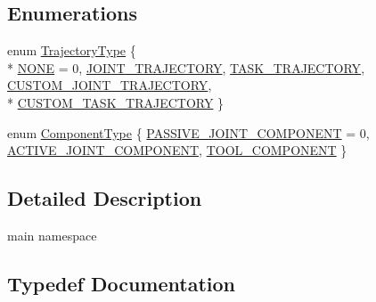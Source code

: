\subsection*{Enumerations}
\begin{DoxyCompactItemize}
\item 
enum \hyperlink{namespacerobotis__manipulator_a008c110bef924df2737c5583000a9293}{Trajectory\+Type} \{ \\*
\hyperlink{namespacerobotis__manipulator_a008c110bef924df2737c5583000a9293abe18ccc5ef07711d5fec3eed3304d2fe}{N\+O\+NE} = 0, 
\hyperlink{namespacerobotis__manipulator_a008c110bef924df2737c5583000a9293a093d62b8684b778b26a1dc4a56239f3a}{J\+O\+I\+N\+T\+\_\+\+T\+R\+A\+J\+E\+C\+T\+O\+RY}, 
\hyperlink{namespacerobotis__manipulator_a008c110bef924df2737c5583000a9293ac3afdf4e66570420074ba4de482896c2}{T\+A\+S\+K\+\_\+\+T\+R\+A\+J\+E\+C\+T\+O\+RY}, 
\hyperlink{namespacerobotis__manipulator_a008c110bef924df2737c5583000a9293ae214e80a3aedf656b76a8863f0f9d169}{C\+U\+S\+T\+O\+M\+\_\+\+J\+O\+I\+N\+T\+\_\+\+T\+R\+A\+J\+E\+C\+T\+O\+RY}, 
\\*
\hyperlink{namespacerobotis__manipulator_a008c110bef924df2737c5583000a9293adda2674cede8ff709aa757c0b9e75c06}{C\+U\+S\+T\+O\+M\+\_\+\+T\+A\+S\+K\+\_\+\+T\+R\+A\+J\+E\+C\+T\+O\+RY}
 \}
\item 
enum \hyperlink{namespacerobotis__manipulator_a2bbf89d1c08dc1d9ff4e28beb939e382}{Component\+Type} \{ \hyperlink{namespacerobotis__manipulator_a2bbf89d1c08dc1d9ff4e28beb939e382a48d9e14bdd971b547f0b4bfcbf8588e7}{P\+A\+S\+S\+I\+V\+E\+\_\+\+J\+O\+I\+N\+T\+\_\+\+C\+O\+M\+P\+O\+N\+E\+NT} = 0, 
\hyperlink{namespacerobotis__manipulator_a2bbf89d1c08dc1d9ff4e28beb939e382acdf3b34914d1a2a028d882beb96fba7c}{A\+C\+T\+I\+V\+E\+\_\+\+J\+O\+I\+N\+T\+\_\+\+C\+O\+M\+P\+O\+N\+E\+NT}, 
\hyperlink{namespacerobotis__manipulator_a2bbf89d1c08dc1d9ff4e28beb939e382a7d53623544fe889894c54a988f503de0}{T\+O\+O\+L\+\_\+\+C\+O\+M\+P\+O\+N\+E\+NT}
 \}
\end{DoxyCompactItemize}


\subsection{Detailed Description}
main namespace 

\subsection{Typedef Documentation}
